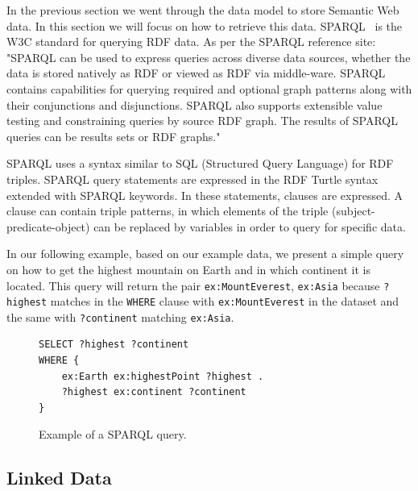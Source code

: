In the previous section we went through the data model to store Semantic Web data. In this section we will focus on how to retrieve this data. SPARQL~\cite{SPARQL} is the W3C standard for querying RDF data. As per the SPARQL reference site: "SPARQL can be used to express queries across diverse data sources, whether the data is stored natively as RDF or viewed as RDF via middle-ware. SPARQL contains capabilities for querying required and optional graph patterns along with their conjunctions and disjunctions. SPARQL also supports extensible value testing and constraining queries by source RDF graph. The results of SPARQL queries can be results sets or RDF graphs."~\cite{SPARQL}

SPARQL uses a syntax similar to SQL (Structured Query Language) for RDF triples. SPARQL query statements are expressed in the RDF Turtle syntax extended with SPARQL keywords. In these statements, clauses are expressed. A clause can contain triple patterns, in which elements of the triple (subject-predicate-object) can be replaced by variables in order to query for specific data.

In our following example, based on our  example data, we present a simple query on how to get the highest mountain on Earth and in which continent it is located. This query will return the pair \texttt{ex:MountEverest}, \texttt{ex:Asia} because \texttt{?highest} matches in the \texttt{WHERE} clause with \texttt{ex:MountEverest} in the dataset and the same with \texttt{?continent} matching \texttt{ex:Asia}.

\begin{figure}[H]
\begin{verbatim}
SELECT ?highest ?continent
WHERE {
    ex:Earth ex:highestPoint ?highest .
    ?highest ex:continent ?continent
}
\end{verbatim}
\caption{Example of a SPARQL query.}
\label{fig:sparqlQueryExample}
\end{figure}



\subsection{Linked Data}

